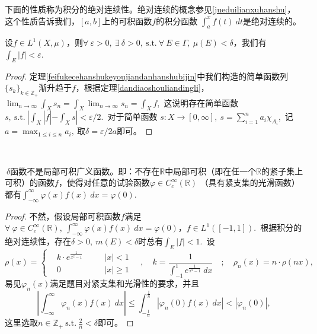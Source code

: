 \documentclass[color=green,thmcnt=section,lang=cn,12pt]{elegantbook}
\numberwithin{equation}{section}%
\numberwithin{figure}{section}%
\newcommand{\RR}{\mathbb{R}}
\newcommand{\ZZ}{\mathbb{Z}}
\newcommand{\ee}{\varepsilon}
\newcommand{\any}{\forall \ }
\newcommand{\exi}{\exists \ }
\newcommand{\sothat}{\ \textrm{s.t.}\ }
\newcommand{\csf}[1]{\{#1_k\}_{k\in \ZZ_+}} %
\newcommand{\jd}[1]{#1=\sum_{i=1}^{n}a_i\chi_{A_i}} %
\newcommand{\ff}[1]{#1:X\to [0,\infty]} %
\begin{document}
下面的性质称为积分的绝对连续性。绝对连续的概念参见\ref{jueduilianxuhanshu}，这个性质告诉我们，$[a,b]$上的可积函数$f$的积分函数
$\int_{a}^{x}f(t)\ dt$是绝对连续的。
\begin{theorem}[积分的绝对连续性]\label{jifendejueduilianxuxing}
    设$f\in L^1(X,\mu)$，则$\any\ee>0,\ \exi \delta>0,\sothat \any E\in \Gamma,\ \mu(E)<\delta$，我们有$\int_E|f|<\ee.\ $
\end{theorem}
\begin{proof}
    定理\ref{feifukecehanshukeyoujiandanhanshubijin}中我们构造的简单函数列$\csf{s}$渐升趋于$f$，根据定理\ref{dandiaoshouliandingli}，
    $\lim_{n\to\infty}\int_Xs_n=\int_X\lim_{n\to\infty}s_n=\int_Xf$,\ 这说明存在简单函数$s,\sothat |\int_X|f|-\int_Xs|<\ee/2$.\ 对于简单函数 
    $\ff{s},\ \jd{s}$,\ 记$a=\max_{1\leq i\leq n}a_i,\ $取$\delta=\ee/2a$即可。
\end{proof}
\ 


\begin{example}
    $\ \delta$函数不是局部可积广义函数。即：不存在$\RR$中局部可积（即在任一个$\RR$的紧子集上可积）的函数$f$，使得对任意的试验函数$\varphi\in C_c^{\infty}(\RR)$
    （具有紧支集的光滑函数）都有$\int_{-\infty}^{\infty}\varphi(x)f(x)\ dx=\varphi(0)$.
\end{example}
\begin{proof}
    不然，假设局部可积函数$f$满足$\any \varphi\in C_c^{\infty}(\RR),\ \int_{-\infty}^{\infty}\varphi(x)f(x)\ dx=\varphi(0)$，$f\in L^1([-1,1])$.\ 
    根据积分的绝对连续性，存在$\delta>0,\ m(E)<\delta$时总有$\int_{E}|f|<1$.\ 设
    \begin{equation*}
        \rho(x)=\left\{\begin{aligned}
            &k\cdot e^{\frac{1}{x^2-1}}&\quad &|x|<1\\
            &0&\quad&|x|\geq 1
        \end{aligned}
        \right.
        \quad,\quad k=\frac{1}{\int_{-1}^{1} e^{\frac{1}{x^2-1}}\ dx}\quad;\quad \rho_n(x)=n\cdot \rho(nx),
    \end{equation*}
    易见$\varphi_n(x)$满足题目对紧支集和光滑性的要求，并且\begin{equation*}
    \left\lvert     \int_{-\infty}^{\infty}\varphi_n(x)f(x)\ dx\right\rvert \leq \int_{-\frac{1}{n}}^{\frac{1}{n}}\left\lvert \varphi_n(0) f(x)\ dx \right\rvert <|\varphi_n(0)|,
    \end{equation*}
    这里选取$n\in \ZZ_+\sothat \frac{2}{n}<\delta$即可。
\end{proof}
\ 
\end{document}
